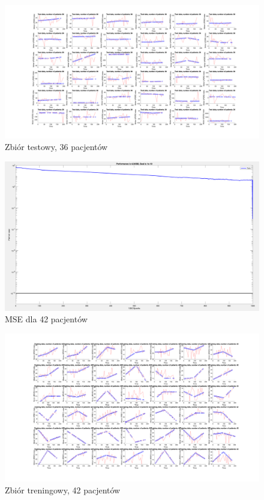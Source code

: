 \documentclass[12pt]{article}
\begin{document}
\begin{figure}[h!]

\centering
\includegraphics[width=1.1\textwidth]{test-cut-36.png}
\caption{Zbiór testowy, 36 pacjentów}

\end{figure}

\begin{figure}[h!]

\centering
\includegraphics[width=1.0\textwidth]{mse-cut-42.png}
\caption{MSE dla 42 pacjentów}

\end{figure}

\begin{figure}[h!]

\centering
\includegraphics[width=1.0\textwidth]{training-cut-42.png}
\caption{Zbiór treningowy, 42 pacjentów}

\end{figure}
\end{document}
